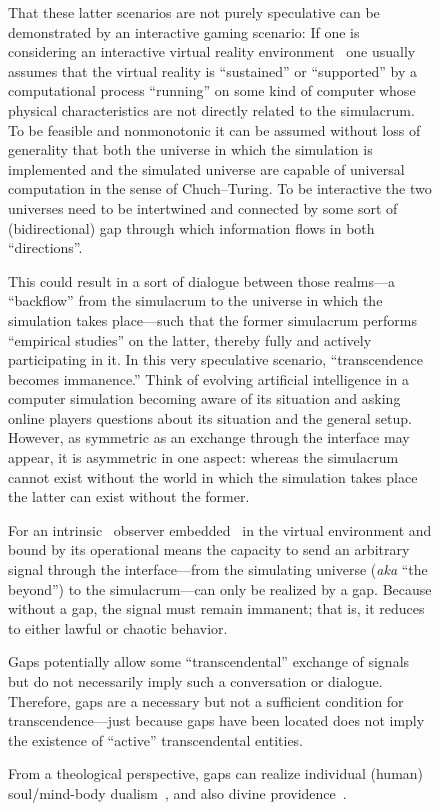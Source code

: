 \documentclass[entropy,article,accept,oneauthor,pdftex]{Definitions/mdpi}
\begin{document}
\begin{figure}[H]
That these latter scenarios are not purely speculative can be demonstrated by an interactive gaming scenario:
If one is considering an interactive virtual reality environment~\cite{simula,permutationcity} one usually assumes that the virtual reality is
``sustained'' or ``supported'' by a computational process ``running'' on some kind of computer whose physical characteristics
are not directly related
 to the simulacrum.  To be feasible and nonmonotonic it can be assumed without loss of generality that both the
universe in which the simulation is implemented and the simulated universe are capable of universal computation in
the sense of Chuch--Turing.
To be interactive the two universes need to be intertwined and connected
by some sort of (bidirectional) gap through which
information flows in both ``directions''.

This could result in a sort of dialogue between those realms---a ``backflow'' from the simulacrum to the universe in which the
simulation takes place---such that the former simulacrum
performs ``empirical studies'' on the latter, thereby fully and actively participating in it.
In this very speculative scenario, ``transcendence becomes immanence.''
Think of evolving artificial intelligence in a computer simulation becoming aware of its situation and asking online players questions
about its situation and the general setup.
However, as symmetric as an exchange through the interface may appear, it is asymmetric in one aspect: whereas the simulacrum cannot exist without the world
in which the simulation takes place
the latter can exist without the former.

For an intrinsic~\cite{svozil-94} observer embedded~\cite{toffoli:79}
in the virtual environment and bound by its operational means the capacity to send an arbitrary signal through the interface---from the simulating universe
({\it aka} ``the beyond'') to the simulacrum---can only be realized by a gap.
Because without a gap, the signal must remain immanent;
that is, it reduces to either lawful or chaotic behavior.

Gaps potentially allow some ``transcendental'' exchange of signals but do not necessarily imply such a
conversation or dialogue.
Therefore, gaps are a necessary but not a sufficient condition for transcendence---just because gaps have been located does not imply the existence of ``active'' transcendental entities.

From a theological perspective, gaps can realize individual (human) soul/mind-body dualism~\cite{eccles:papal},
and also divine providence~\cite[Sect.~III,~9-16]{frank,franke}.


\end{figure}
\end{document}
